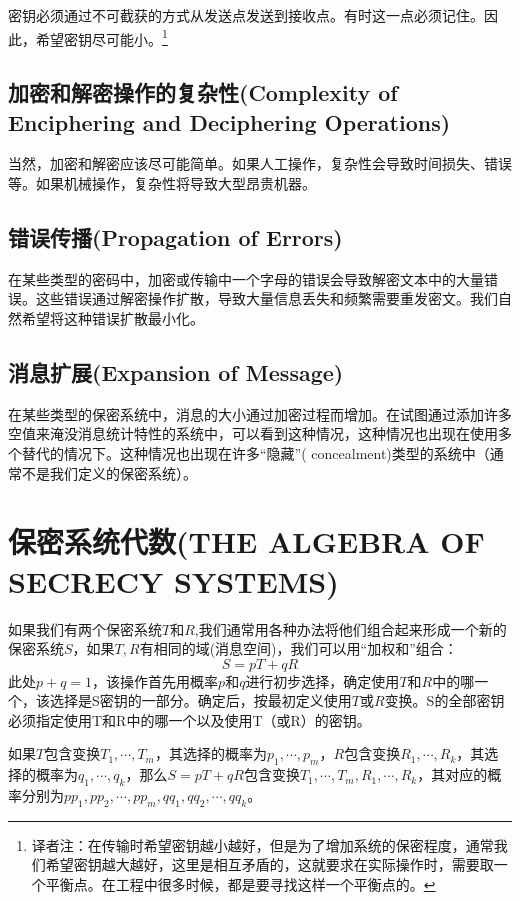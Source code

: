 \documentclass[]{article}
\begin{document}
密钥必须通过不可截获的方式从发送点发送到接收点。有时这一点必须记住。因此，希望密钥尽可能小。\footnote{译者注：在传输时希望密钥越小越好，但是为了增加系统的保密程度，通常我们希望密钥越大越好，这里是相互矛盾的，这就要求在实际操作时，需要取一个平衡点。在工程中很多时候，都是要寻找这样一个平衡点的。}

\subsection{加密和解密操作的复杂性(Complexity of Enciphering and Deciphering Operations)}

当然，加密和解密应该尽可能简单。如果人工操作，复杂性会导致时间损失、错误等。如果机械操作，复杂性将导致大型昂贵机器。

\subsection{错误传播(Propagation of Errors)}

在某些类型的密码中，加密或传输中一个字母的错误会导致解密文本中的大量错误。这些错误通过解密操作扩散，导致大量信息丢失和频繁需要重发密文。我们自然希望将这种错误扩散最小化。

\subsection{消息扩展(Expansion of Message)}
在某些类型的保密系统中，消息的大小通过加密过程而增加。在试图通过添加许多空值来淹没消息统计特性的系统中，可以看到这种情况，这种情况也出现在使用多个替代的情况下。这种情况也出现在许多“隐藏”( concealment)类型的系统中（通常不是我们定义的保密系统）。

\newpage
%   
%

\section{保密系统代数(THE ALGEBRA OF SECRECY SYSTEMS)}
如果我们有两个保密系统$T$和$R$,我们通常用各种办法将他们组合起来形成一个新的保密系统$S$，如果$T,R$有相同的域(消息空间)，我们可以用“加权和”组合：
\[S=pT+qR\]
此处$p+q=1$，该操作首先用概率$p$和$q$进行初步选择，确定使用$T$和$R$中的哪一个，该选择是S密钥的一部分。确定后，按最初定义使用$T$或$R$变换。S的全部密钥必须指定使用T和R中的哪一个以及使用T（或R）的密钥。

如果$T$包含变换$T_1,\cdots,T_m$，其选择的概率为$p_1,\cdots,p_m$，$R$包含变换$R_1,\cdots,R_k$，其选择的概率为$q_1,\cdots,q_k$，那么$S=pT+qR$包含变换$T_1,\cdots,T_m,R_1,\cdots,R_k$，其对应的概率分别为$pp_1,pp_2,\cdots,pp_m,qq_1,qq_2,\cdots,qq_k$。
\end{document}
